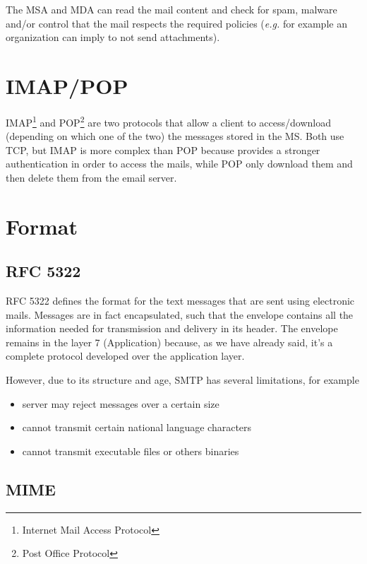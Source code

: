 \documentclass[oneside]{academica}
\begin{document}
\vspace{-10pt}
The MSA and MDA can read the mail content and check for spam, malware and/or control that the mail respects the required policies (\textit{e.g.} for example an organization can imply to not send attachments).

\section{IMAP/POP}

IMAP\footnote{Internet Mail Access Protocol} and POP\footnote{Post Office Protocol} are two protocols that allow a client to access/download (depending on which one of the two) the messages stored in the MS.
Both use TCP, but IMAP is more complex than POP because provides a stronger authentication in order to access the mails, while POP only download them and then delete them from the email server.

\section{Format}

\subsection{RFC 5322}

RFC 5322 defines the format for the text messages that are sent using electronic mails.
Messages are in fact encapsulated, such that the envelope contains all the information needed for transmission and delivery in its header.
The envelope remains in the layer 7 (Application) because, as we have already said, it's a complete protocol developed over the application layer.

However, due to its structure and age, SMTP has several limitations, for example
\begin{itemize}
  \item server may reject messages over a certain size
  \item cannot transmit certain national language characters
  \item cannot transmit executable files or others binaries
\end{itemize}

\subsection{MIME}
\end{document}
